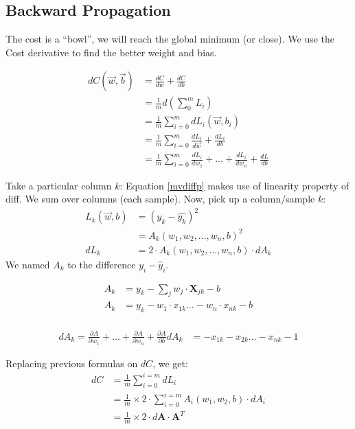 \subsection{Backward Propagation}

The cost is a ``bowl'', we will reach the global minimum (or close).
We use the Cost derivative to find the better weight and bias. 

\begin{align}
  dC(\vec{w}, \vec{b}) &= \frac{dC}{dw} + \frac{dC}{db}\nonumber\\
  &= \frac{1}{m} d(\sum^m_0 L_i)\nonumber\\
  &= \frac{1}{m} \sum^m_{i=0} dL_i(\vec{w}, b_i)\label{mvdiffp}\\
  &= \frac{1}{m} \sum^m_{i=0} \frac{dL_i}{d\vec{w}} + \frac{dL_i}{db}\nonumber\\
  &= \frac{1}{m} \sum^m_{i=0} \frac{dL_i}{dw_1} +\ldots +\frac{dL_i}{dw_n} + \frac{dL}{db} \nonumber
\end{align}

Take a particular column $k$:
Equation \ref{mvdiffp} makes use of linearity property of diff. We sum over columns (each sample). Now, pick up a column/sample $k$:
\begin{align*}
  L_k(\vec{w},b) &= (y_k - \hat{y_k})^2\\
    &= A_k(w_1, w_2,\ldots, w_n, b)^2\\
  dL_k &= 2\cdot{}A_k(w_1,w_2,\ldots, w_n, b)\cdot{}dA_k
\end{align*}
We named $A_k$ to the difference $y_i-\hat{y}_i$.

\begin{align*}
  A_k  &= y_k - \sum_j w_j\cdot{}\mathbf{X}_{jk} - b \\
  A_k  &= y_k - w_1\cdot{}x_{1k} \ldots{}-w_n\cdot{}x_{nk} - b \\
\end{align*}

\begin{align}
  dA_k = \frac{\partial A}{\partial w_1}+ \ldots + \frac{\partial A}{\partial w_n}+ \frac{\partial A}{\partial b} \nonumber
  dA_k &=  -x_{1k} -x_{2k} \ldots - x_{nk} -1 \label{dA}
\end{align}

Replacing previous formulas on $dC$, we get:
\begin{align}
  dC &= \frac{1}{m}\sum_{i=0}^{i=m} dL_i\\
  &= \frac{1}{m}\times{}2\cdot{}\sum_{i=0}^{i=m}A_i(w_1, w_2, b)\cdot{}dA_i\\
  &= \frac{1}{m}\times{}2\cdot{}d\mathbf{A}\cdot{}\mathbf{A}^T
\end{align}


